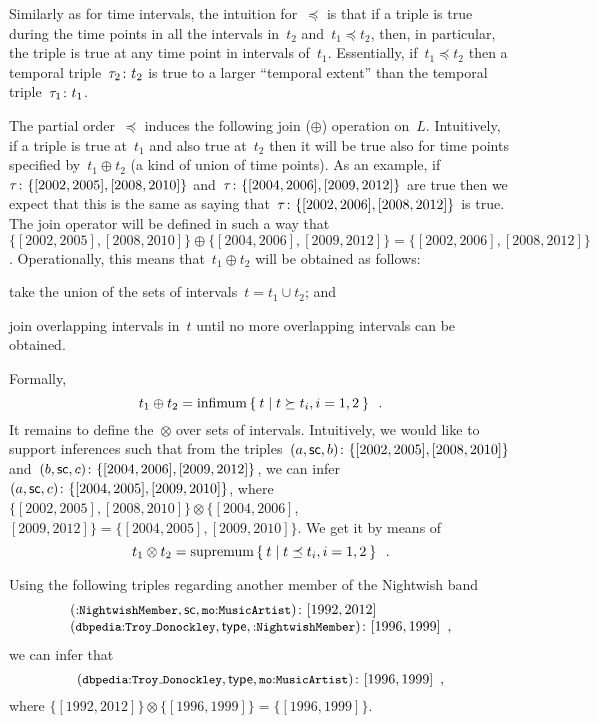 Similarly as for time intervals, the intuition for~$\preceq$ is that if a triple is true during the time points in all
the intervals in~$t_{2}$ and~$t_{1} \preceq t_{2}$, then, in particular, the triple is true at any time point in
intervals of~$t_{1}$. 
%
Essentially, if~$t_{1} \preceq t_{2}$ then a temporal triple~$\mbox{$\tau_{2}\colon t_{2}$}$ is true to a larger ``temporal
extent'' than the temporal triple~$\mbox{$\tau_{1}\colon t_{1}$}$. 

The partial order~$\preceq$ induces the following join ($\oplus$) operation on~$L$. Intuitively, if a triple is true
at~$t_{1}$ and also true at~$t_{2}$ then it will be true also for time points specified by~$t_{1} \oplus t_{2}$ (a kind
of union of time points).
%
As an example, if $\mbox{$\tau\colon\{[2002,2005], [2008,2010]\}$}$ and~$\mbox{$\tau\colon\{[2004,2006], [2009,2012]\}$}$ are
true then we expect that this is the same as saying that~$\mbox{$\tau\colon\{[2002,2006], [2008,2012]\}$}$ is true. 
%
The join operator will be defined in such a way that~$\{[2002,2005], [2008,2010]\} \oplus \{[2004,2006], [2009,2012]\} =
\{[2002,2006], [2008,2012]\}$.
%
Operationally, this means that~$t_{1} \oplus t_{2}$ will be obtained as follows: 
\begin{enumerate*}[label=(\roman*)]
\item take the union of the sets of intervals~$t = t_{1} \cup t_{2}$; and
\item join overlapping intervals in~$t$ until no more overlapping intervals can be obtained.
\end{enumerate*}
%
Formally,
%
\[
t_1 \oplus t_2 = \mathrm{infimum }\left\{\:t \mid t \succeq t_{i}, i=1,2\:\right\} \enspace .
\]
\nd It remains to define the~$\otimes$ over sets of intervals.
%
Intuitively, we would like to support inferences such that
%
from the triples~$\mbox{$(a, \mathsf{sc}, b)\colon\{[2002,2005], [2008,2010]\}$}$ and~$\mbox{$(b, \mathsf{sc},
    c)\colon\{[2004,2006], [2009,2012]\}$}$, we can infer $\mbox{$(a, \mathsf{sc}, c)\colon\{[2004,2005], [2009,2010]\}$}$,
%
where~$\{[2002,2005], [2008,2010]\} \otimes \{[2004,2006]$, $[2009,2012]\} = \{[2004,2005], [2009,2010]\}$.
%
We get it by means of
% 
\[
t_1 \otimes t_2 = \mathrm{supremum }\left\{\:t \mid t \preceq t_{i}, i=1,2 \:\right\}  \enspace .
\]


\begin{example}
  \label{exU1}
  Using the following triples regarding another member of the Nightwish band
  \[
  \begin{array}{l}
    \fuzzyg{\triple{\qname{}{NightwishMember}, \subclass, \qname{mo}{MusicArtist}}}{[1992,2012]}\\
    \fuzzyg{\triple{\qname{dbpedia}{Troy\mathunderscore{}Donockley}, \typeR, \qname{}{NightwishMember}}}{[1996, 1999]} \enspace ,
  \end{array} 
  \]
  we can infer that \vspace{-\abovedisplayskip}
  \[
    \fuzzyg{\triple{\qname{dbpedia}{Troy\mathunderscore{}Donockley}, \typeR, \qname{mo}{MusicArtist}}}{[1996, 1999]} \enspace ,
  \]
  where
  \(
  \{[1992,2012]\} \otimes \{[1996, 1999]\} = \{[1996, 1999]\}
  \).
\end{example}




